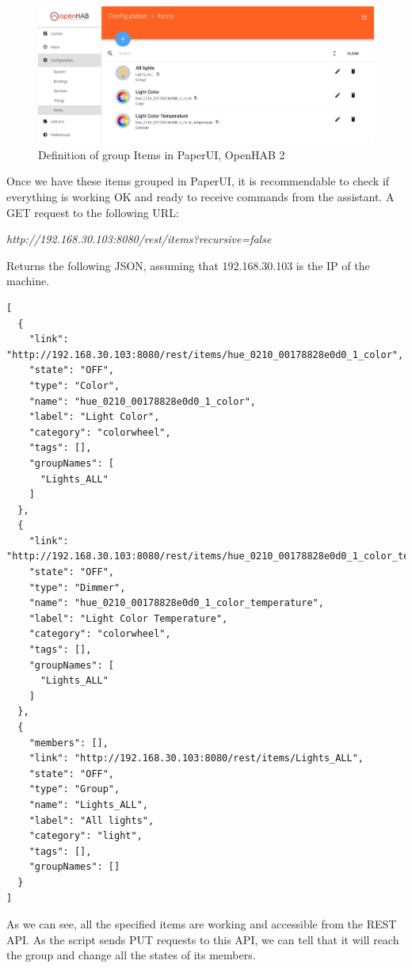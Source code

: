 \begin{figure}
	\centering
	\includegraphics[width=1\textwidth]{images/Chapter_07/group-definition-paperui.png}
	\caption{Definition of group Items in PaperUI, OpenHAB 2}
	\label{fig:group-definition-paperui}
\end{figure}

Once we have these items grouped in PaperUI, it is recommendable to check if everything is working OK and ready to receive commands
from the assistant. A GET request to the following URL:\\
\begin{center}
	\textit{http://192.168.30.103:8080/rest/items?recursive=false}\\
\end{center}
Returns the following JSON, assuming that 192.168.30.103 is the IP of the machine.

\begin{lstlisting}[style=Consola]
[
  {
    "link": "http://192.168.30.103:8080/rest/items/hue_0210_00178828e0d0_1_color",
    "state": "OFF",
    "type": "Color",
    "name": "hue_0210_00178828e0d0_1_color",
    "label": "Light Color",
    "category": "colorwheel",
    "tags": [],
    "groupNames": [
      "Lights_ALL"
    ]
  },
  {
    "link": "http://192.168.30.103:8080/rest/items/hue_0210_00178828e0d0_1_color_temperature",
    "state": "OFF",
    "type": "Dimmer",
    "name": "hue_0210_00178828e0d0_1_color_temperature",
    "label": "Light Color Temperature",
    "category": "colorwheel",
    "tags": [],
    "groupNames": [
      "Lights_ALL"
    ]
  },
  {
    "members": [],
    "link": "http://192.168.30.103:8080/rest/items/Lights_ALL",
    "state": "OFF",
    "type": "Group",
    "name": "Lights_ALL",
    "label": "All lights",
    "category": "light",
    "tags": [],
    "groupNames": []
  }
]
\end{lstlisting}

As we can see, all the specified items are working and accessible from the REST API. As the script sends PUT requests to this API,
we can tell that it will reach the group and change all the states of its members.

